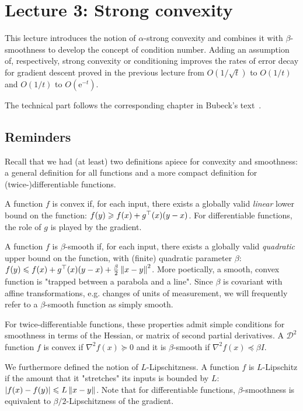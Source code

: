 \section{Lecture 3: Strong convexity}

This lecture introduces the notion of
$\alpha$-strong convexity
and combines it with
$\beta$-smoothness to develop the concept of
condition number.
Adding an assumption of, respectively,
strong convexity or conditioning
improves the rates of error decay
for gradient descent proved
in the previous lecture from
$O(1/\sqrt{t})$ to $O(1/t)$ and
$O(1/t)$ to $O(\mathrm{e}^{-t})$.

The technical part follows the corresponding chapter in Bubeck's
text~\cite{bubeck}.

\subsection{Reminders}

Recall that we had (at least)
two definitions apiece for
convexity and smoothness:
a general definition for all functions
and a more compact definition for (twice-)differentiable functions.

A function $f$ is convex
if, for each input, there exists a
globally valid \emph{linear} lower bound on the function:
$f(y) \geqslant f(x) + g^\top(x)(y-x)$.
For differentiable functions,
the role of $g$ is played by the gradient.

A function $f$ is $\beta$-smooth
if, for each input, there exists a
globally valid \emph{quadratic} upper bound on the function,
with (finite) quadratic parameter $\beta$:
$f(y) \leqslant f(x) + g^\top(x)(y-x) + \frac{\beta}{2}\left\lVert x-y\right\rVert^2$.
More poetically,
a smooth, convex function is
"trapped between a parabola and a line".
Since $\beta$ is covariant with affine transformations,
e.g. changes of units of measurement,
we will frequently refer to a $\beta$-smooth function as simply
smooth.

For twice-differentiable functions,
these properties admit simple conditions
for smoothness in terms of the Hessian,
or matrix of second partial derivatives.
A $\mathcal{D}^2$ function $f$ is convex if
$\nabla^2f(x) \succeq 0$
and it is $\beta$-smooth if
$\nabla^2f(x) \preceq \beta I$.

We furthermore defined the notion of $L$-Lipschitzness.
A function $f$ is $L$-Lipschitz if the amount that it
"stretches" its inputs is bounded by $L$:
$\left\lvert f(x)-f(y)\right\rvert \leqslant L\left\lVert x-y\right\rVert$.
Note that for differentiable functions,
$\beta$-smoothness is equivalent to
$\beta/2$-Lipschitzness of the gradient.

